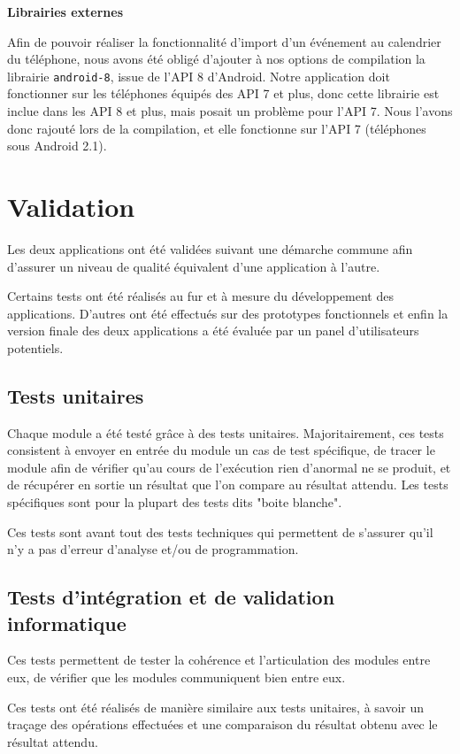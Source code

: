 \documentclass[a4paper, 11px]{article}
\begin{document}
{\bf Librairies externes}

Afin de pouvoir réaliser la fonctionnalité d'import d'un événement au calendrier du téléphone, nous avons été obligé d'ajouter à nos options de compilation la librairie \texttt{android-8}, issue de l'API 8 d'Android. Notre application doit fonctionner sur les téléphones équipés des API 7 et plus, donc cette librairie est inclue dans les API 8 et plus, mais posait un problème pour l'API 7. Nous l'avons donc rajouté lors de la compilation, et elle fonctionne sur l'API 7 (téléphones sous Android 2.1).


\section{Validation}
Les deux applications ont été validées suivant une démarche commune afin d'assurer un niveau de qualité équivalent d'une application à l'autre.

Certains tests ont été réalisés au fur et à mesure du développement des applications. D'autres ont été effectués sur des prototypes fonctionnels et enfin la version finale des deux applications a été évaluée par un panel d'utilisateurs potentiels.

\subsection{Tests unitaires}
Chaque module a été testé grâce à des tests unitaires. Majoritairement, ces tests consistent à envoyer en entrée du module un cas de test spécifique, de tracer le module afin de vérifier qu'au cours de l’exécution rien d'anormal ne se produit, et de récupérer en sortie un résultat que l'on compare au résultat attendu. Les tests spécifiques sont pour la plupart des tests dits "boite blanche".

Ces tests sont avant tout des tests techniques qui permettent de s'assurer qu'il n'y a pas d'erreur d'analyse et/ou de programmation.

\subsection{Tests d'intégration et de validation informatique}
Ces tests permettent de tester la cohérence et l'articulation des modules entre eux, de vérifier que les modules communiquent bien entre eux.


Ces tests ont été réalisés de manière similaire aux tests unitaires, à savoir un traçage des opérations effectuées et une comparaison du résultat obtenu avec le résultat attendu.
\end{document}
